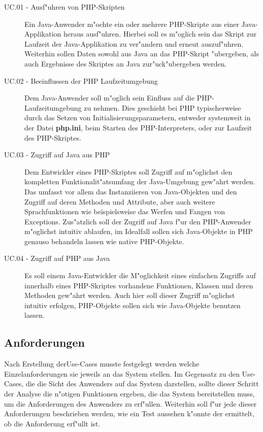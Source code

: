 \begin{description}
    \item[UC.01 - Ausf"uhren von PHP-Skripten] Ein Java-Anwender m"ochte ein oder mehrere PHP-Skripte aus einer
        Java-Applikation heraus ausf"uhren. Hierbei soll es m"oglich sein das Skript zur Laufzeit der Java-Applikation
        zu ver"andern und erneut auszuf"uhren. Weiterhin sollen Daten sowohl aus Java an das PHP-Skript "ubergeben, als
        auch Ergebnisse des Skriptes an Java zur"uck"ubergeben werden.
    \item[UC.02 - Beeinflussen der PHP Laufzeitumgebung] Dem Java-Anwender soll m"oglich sein Einfluss auf die PHP-Laufzeitumgebung
        zu nehmen. Dies geschieht bei PHP typischerweise durch das Setzen von Initialisierungsparametern, entweder systemweit
        in der Datei \textbf{php.ini}, beim Starten des PHP-Interpreters, oder zur Laufzeit des PHP-Skriptes.
    \item[UC.03 - Zugriff auf Java aus PHP] Dem Entwickler eines PHP-Skriptes soll Zugriff auf m"oglichst den kompletten 
        Funktionalit"atsumfang der Java-Umgebung gew"ahrt werden. Das umfasst vor allem das Instanziieren von Java-Objekten und
        den Zugriff auf deren Methoden und Attribute, aber auch weitere Sprachfunktionen wie beispielsweise das Werfen und 
        Fangen von Exceptions. Zus"atzlich soll der Zugriff auf Java f"ur den PHP-Anwender m"oglichst intuitiv ablaufen, im
        Idealfall sollen sich Java-Objekte in PHP genauso behandeln lassen wie native PHP-Objekte.
    \item[UC.04 - Zugriff auf PHP aus Java] Es soll einem Java-Entwickler die M"oglichkeit eines einfachen Zugriffs auf
        innerhalb eines PHP-Skriptes vorhandene Funktionen, Klassen und deren Methoden gew"ahrt werden. Auch hier soll
        dieser Zugriff m"oglichst intuitiv erfolgen, PHP-Objekte sollen sich wie Java-Objekte benutzen lassen. 
\end{description}

\subsection{Anforderungen}
\label{sec:chap1:ana:ap}

Nach Erstellung derUse-Cases musste festgelegt werden welche Einzelanforderungen sie jeweils an das System stellen.
Im Gegensatz zu den Use-Cases, die die Sicht des Anwenders auf das System darstellen, sollte dieser Schritt der Analyse
die n"otigen Funktionen ergeben, die das System bereitstellen muss, um die Anforderungen des Anwenders zu erf"ullen.
Weiterhin soll f"ur jede dieser Anforderungen beschrieben werden, wie ein Test aussehen k"onnte der ermittelt, ob die 
Anforderung erf"ullt ist.

